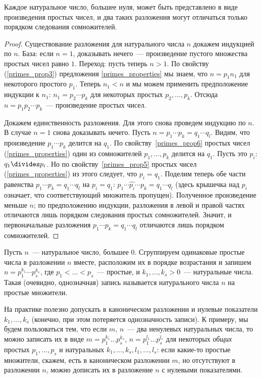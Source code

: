 \begin{theorem}\label{theorem_ota}
Каждое натуральное число, большее нуля, может быть представлено в
виде произведения простых чисел, и два таких разложения могут
отличаться только порядком следования сомножителей.
\end{theorem}
\begin{proof}
Существование разложения для натурального числа $n$ докажем индукцией
по $n$. База: если $n=1$, доказывать нечего~--- произведение пустого
множества простых чисел равно $1$. Переход: пусть теперь $n>1$. По
свойству (\ref{primes_prop3}) предложения \ref{primes_properties}
мы знаем, что $n=p_1n_1$ для некоторого простого $p_1$. Теперь $n_1<n$
и мы можем применить предположение индукции к $n_1$:
$n_1=p_2\cdots p_k$ для некоторых простых $p_2,\dots,p_k$. Отсюда
$n=p_1p_2\cdots p_k$~--- произведение простых чисел.

Докажем единственность разложения. Для этого снова проведем индукцию
по $n$. В случае $n=1$ снова доказывать нечего. Пусть $n=p_1\cdots
p_k=q_1\cdots q_l$. Видим, что произведение $p_1\cdots p_k$ делится на
$q_1$. По свойству~\ref{primes_prop6} простых чисел
(\ref{primes_properties})
один из сомножителей $p_1,\dots,p_k$ делится на $q_1$. Пусть это
$p_i$: $q_1\divides p_i$. Но по свойству~\ref{primes_prop5} простых чисел
(\ref{primes_properties}) из этого следует, что $p_i=q_1$. Поделим
теперь обе части равенства $p_1\cdots p_k=q_1\cdots q_l$ на
$p_i=q_1$: $p_1\cdots\widehat{p_i}\cdots p_k=q_1\cdots q_l$ (здесь
крышечка над $p_i$ означает, что соответствующий множитель
пропущен). Полученное произведение меньше $n$; по предположению
индукции, разложения в левой и правой частях отличаются лишь порядком
следования простых сомножителей. Значит, и первоначальные разложения
$p_1\cdots p_k=q_1\cdots q_l$ отличаются лишь порядком сомножителей.
\end{proof}

\begin{definition}
Пусть $n$~--- натуральное число, большее $0$.
Сгруппируем одинаковые простые числа в разложении 
$n$ вместе, расположим их в порядке возрастания и запишем
$n=p_1^{k_1}\cdots p_s^{k_s}$, где $p_1<\dots<p_s$~--- простые, и
$k_1,\dots,k_s>0$~--- натуральные числа. Такая (очевидно, однозначная)
запись называется 
натурального числа $n$ на простые множители.
\end{definition}
\begin{remark}\label{remark_canonical_zeros}
На практике полезно допускать в каноническом разложении и нулевые
показатели $k_1,\dots,k_s$ (конечно,
при этом потеряется однозначность записи). К примеру, мы будем
пользоваться тем, что если $m$, $n$~--- два ненулевых натуральных
числа, то можно записать их в виде $m=p_1^{k_1}\dots p_s^{k_s}$,
$n=p_1^{l_1}\dots p_s^{l_s}$ для некоторых {\it общих} простых
$p_1,\dots,p_s$ и натуральных $k_1,\dots,k_s,l_1,\dots,l_s$: если
какие-то простые
множители, скажем, есть в каноническом разложении $m$, но отсутствуют
в разложении $n$, можно дописать их в разложение $n$ с нулевыми показателями.
\end{remark}

